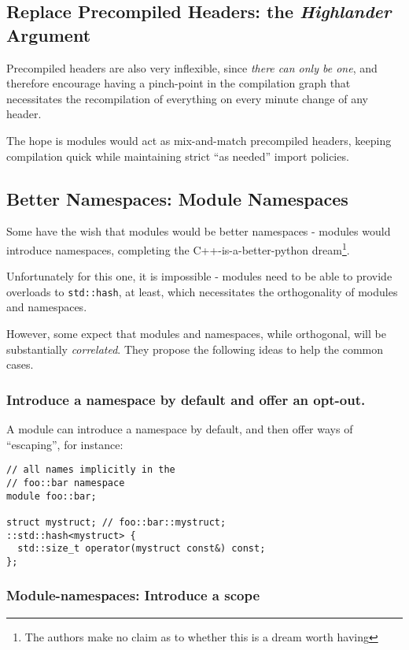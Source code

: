 \documentclass[reqno]{article}
\begin{document}
\begin{multicols}{2}
\subsection{Replace Precompiled Headers: the \emph{Highlander} Argument}

Precompiled headers are also very inflexible, since \emph{there can only be
one}, and therefore encourage having a pinch-point in the compilation graph that
necessitates the recompilation of everything on every minute change of any
header.

The hope is modules would act as mix-and-match precompiled headers, keeping
compilation quick while maintaining strict “as needed” import policies.


\subsection{Better Namespaces: Module Namespaces}

Some have the wish that modules would be better namespaces - modules would
introduce namespaces, completing the C++-is-a-better-python dream\footnote{The
authors make no claim as to whether this is a dream worth having}.

Unfortunately for this one, it is impossible - modules need to be able to
provide overloads to \texttt{std::hash}, at least, which necessitates the
orthogonality of modules and namespaces.

However, some expect that modules and namespaces, while orthogonal, will be
substantially \emph{correlated}. They propose the following ideas to help the
common cases.


\subsubsection{Introduce a namespace by default and offer an opt-out.}

A module can introduce a namespace by default, and then offer ways of
“escaping”, for instance:

\begin{verbatim}
// all names implicitly in the
// foo::bar namespace
module foo::bar;

struct mystruct; // foo::bar::mystruct;
::std::hash<mystruct> {
  std::size_t operator(mystruct const&) const;
};
\end{verbatim}


\subsubsection{Module-namespaces: Introduce a scope}


\end{multicols}
\end{document}
